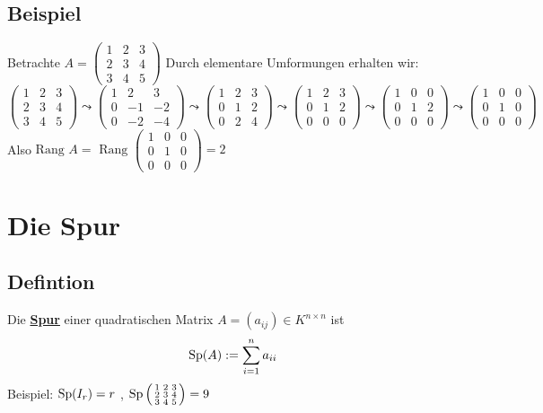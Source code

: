 \subsection{Beispiel} %
\label{sub:beispiel}
Betrachte $A= \begin{pmatrix}
	1 & 2 & 3 \\
	2 & 3 & 4 \\
	3 & 4 & 5
\end{pmatrix}$ Durch elementare Umformungen erhalten wir:
\[
	\begin{pmatrix}
		1 & 2 & 3 \\
		2 & 3 & 4 \\
		3 & 4 & 5
	\end{pmatrix} \leadsto \begin{pmatrix}
		1 & 2 & 3 \\
		0 & -1 & -2 \\
		0 & -2 & -4
	\end{pmatrix} \leadsto \begin{pmatrix}
		1 & 2 & 3 \\
		0 & 1 & 2 \\
		0 & 2 & 4
	\end{pmatrix} \leadsto \begin{pmatrix}
		1 & 2 & 3 \\
		0 & 1 & 2 \\
		0 & 0 & 0 
	\end{pmatrix} \leadsto \begin{pmatrix}
		1 & 0 & 0 \\
		0 & 1 & 2 \\
		0 & 0 & 0
	\end{pmatrix} \leadsto \begin{pmatrix}
		1 & 0 & 0 \\
		0 & 1 & 0 \\
		0 & 0 & 0
	\end{pmatrix}
\]
Also $\text{Rang }A = \text{ Rang } \left( \begin{smallmatrix}
	1 & 0 & 0 \\
	0 & 1 & 0 \\
	0 & 0 & 0
\end{smallmatrix} \right) = 2$

\section{Die Spur} %
\label{sec:die_spur}

\subsection{Defintion} %
\label{sub:defintion}
Die \textbf{\underline{Spur}} einer quadratischen Matrix $A= (a_{ij}) \in K^{n \times n}$ ist 
\[
	\operatorname{Sp} (A) := \sum\limits_{i=1}^{n} a_{ii}
\]
Beispiel: $\operatorname{Sp}(I_r) = r$ , $\operatorname{Sp} \left( \begin{smallmatrix}
	1 & 2 & 3 \\
	2 & 3 & 4 \\
	3 & 4 & 5
\end{smallmatrix} \right) = 9$

